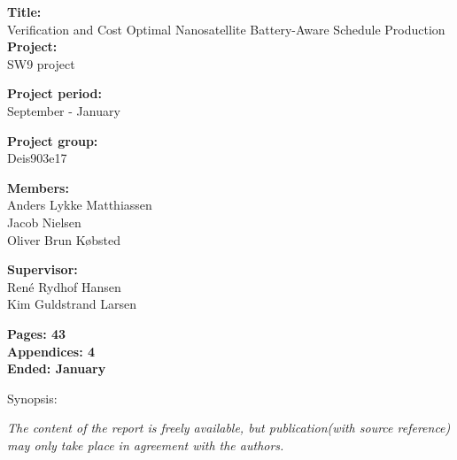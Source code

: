 \begin{minipage}[t]{0.48\textwidth}
\textbf{Title:} \\[5pt]\hspace{2ex}
Verification and Cost Optimal Nanosatellite Battery-Aware Schedule Production\\

\textbf{Project:} \\[5pt]\bigskip\hspace{2ex}
SW9 project

\textbf{Project period:} \\[5pt]\bigskip\hspace{2ex}
 September -  January

\textbf{Project group:} \\[5pt]\bigskip\hspace{2ex}
Deis903e17

\textbf{Members:} \\[5pt]\hspace*{2ex}
Anders Lykke Matthiassen \\\hspace*{2ex}
Jacob Nielsen \\\hspace*{2ex}
Oliver Brun Købsted 


\textbf{Supervisor:} \\[5pt]\hspace*{2ex}
René Rydhof Hansen\\[5pt]\hspace*{2ex}
Kim Guldstrand Larsen

\vspace*{1cm}

\textbf{Pages: 43} \\
\textbf{Appendices: 4} \\
\textbf{Ended:  January}

\end{minipage}
\hfill
\begin{minipage}[t]{0.483\textwidth}
Synopsis: \\[5pt]
\fbox{\parbox{7cm}{\bigskip\bigskip}}
\end{minipage}

\vfill

{\footnotesize\itshape The content of the report is freely available, but publication(with source reference) may only take place in agreement with the authors.}
